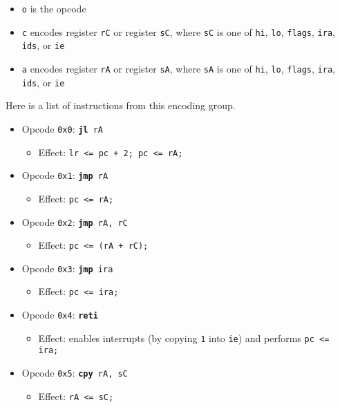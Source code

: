 \documentclass{article}
\begin{document}
	\singlespacing
	\begin{itemize}
		\item \texttt{o} is the opcode
		\item \texttt{c} encodes register \texttt{rC} or register
		\texttt{sC}, where \texttt{sC} is one of \texttt{hi}, \texttt{lo},
		\texttt{flags}, \texttt{ira}, \texttt{ids}, or \texttt{ie}
		\item \texttt{a} encodes register \texttt{rA} or register
		\texttt{sA}, where \texttt{sA} is one of \texttt{hi}, \texttt{lo},
		\texttt{flags}, \texttt{ira}, \texttt{ids}, or \texttt{ie}
	\end{itemize}
	\doublespacing

	Here is a list of instructions from this encoding group.

	\singlespacing
	\begin{itemize}
		\item Opcode \texttt{0x0}:
			\texttt{\textbf{jl} rA}
		\begin{itemize}
			\item Effect: \texttt{lr <= pc + 2; pc <= rA;}
		\end{itemize}
		\item Opcode \texttt{0x1}:
			\texttt{\textbf{jmp} rA}
		\begin{itemize}
			\item Effect: \texttt{pc <= rA;}
		\end{itemize}
		\item Opcode \texttt{0x2}:
			\texttt{\textbf{jmp} rA, rC}
		\begin{itemize}
			\item Effect: \texttt{pc <= (rA + rC);}
		\end{itemize}
		\item Opcode \texttt{0x3}:
			\texttt{\textbf{jmp} ira}
		\begin{itemize}
			\item Effect: \texttt{pc <= ira;}
		\end{itemize}
		\item Opcode \texttt{0x4}:
			\texttt{\textbf{reti}}
		\begin{itemize}
			\item Effect: enables interrupts (by copying \texttt{1} into
			\texttt{ie}) and performs \texttt{pc <= ira;}
		\end{itemize}
		\item Opcode \texttt{0x5}:
			\texttt{\textbf{cpy} rA, sC}
		\begin{itemize}
			\item Effect: \texttt{rA <= sC;}

\end{itemize}
\end{itemize}
\end{document}
